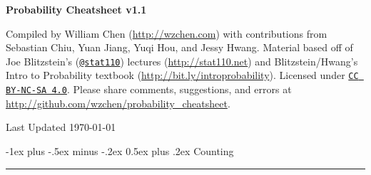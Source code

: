 \documentclass[10pt,landscape]{article}
\makeatletter
\theoremstyle{definition}
\renewcommand{\section}{\@startsection{section}{1}{0mm}%
                                {-1ex plus -.5ex minus -.2ex}%
                                {0.5ex plus .2ex}%
                                {\normalfont\large\bfseries}}
\renewcommand{\subsection}{\@startsection{subsection}{2}{0mm}%
                                {-1explus -.5ex minus -.2ex}%
                                {0.5ex plus .2ex}%
                                {\normalfont\normalsize\bfseries}}
\makeatother
\begin{document}
\raggedright
\footnotesize
\begin{multicols}{3}


\setlength{\premulticols}{1pt}
\setlength{\postmulticols}{1pt}
\setlength{\multicolsep}{1pt}
\setlength{\columnsep}{2pt}


\begin{center}
     \Large{\textbf{Probability Cheatsheet v1.1}} \\
\end{center}


\scriptsize

Compiled by William Chen (\url{http://wzchen.com}) with contributions from Sebastian Chiu, Yuan Jiang, Yuqi Hou, and Jessy Hwang. Material based off of Joe Blitzstein's (\texttt{\href{http://twitter.com/stat110}{@stat110}}) lectures (\url{http://stat110.net}) and Blitzstein/Hwang's Intro to Probability textbook (\url{http://bit.ly/introprobability}). Licensed under \texttt{\href{http://creativecommons.org/licenses/by-nc-sa/4.0/}{CC BY-NC-SA 4.0}}. Please share comments, suggestions, and errors at \url{http://github.com/wzchen/probability_cheatsheet}.

\begin{center}
    Last Updated \today
\end{center}




\section{Counting}\smallskip \hrule height 2pt \smallskip



\end{multicols}
\end{document}

